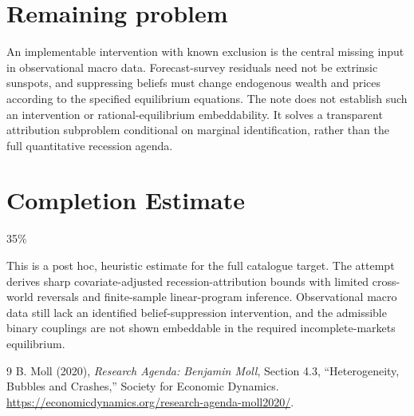 \documentclass[11pt]{article}
\theoremstyle{definition}
\begin{document}
\section*{Remaining problem}
An implementable intervention with known exclusion is the central missing
input in observational macro data. Forecast-survey residuals need not be
extrinsic sunspots, and suppressing beliefs must change endogenous wealth
and prices according to the specified equilibrium equations. The note does
not establish such an intervention or rational-equilibrium embeddability.
It solves a transparent attribution subproblem conditional on marginal
identification, rather than the full quantitative recession agenda.

\section{Completion Estimate}
35\%

This is a post hoc, heuristic estimate for the full catalogue target.
The attempt derives sharp covariate-adjusted recession-attribution bounds with limited cross-world reversals and finite-sample linear-program inference. Observational macro data still lack an identified belief-suppression intervention, and the admissible binary couplings are not shown embeddable in the required incomplete-markets equilibrium.

\begin{thebibliography}{9}
 B. Moll (2020), \emph{Research Agenda: Benjamin Moll},
Section 4.3, ``Heterogeneity, Bubbles and Crashes,'' Society for Economic Dynamics.
\url{https://economicdynamics.org/research-agenda-moll2020/}.
\end{thebibliography}
\end{document}

